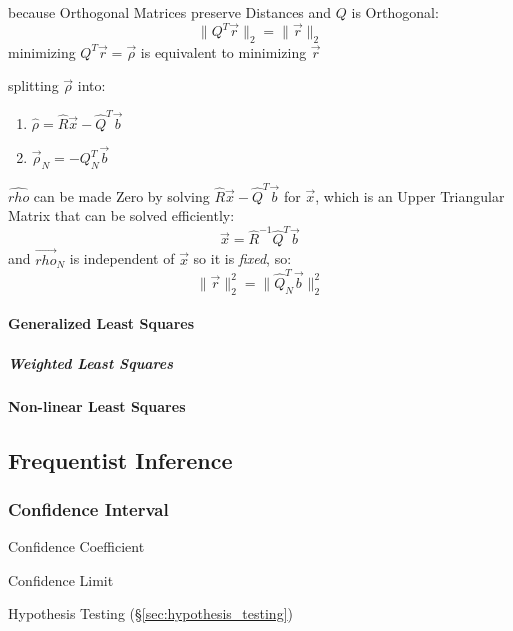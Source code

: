 because Orthogonal Matrices preserve Distances and $Q$ is Orthogonal:
\[
  \|Q^T\vec{r}\|_2 = \|\vec{r}\|_2
\]
minimizing $Q^T\vec{r} = \vec{\rho}$ is equivalent to minimizing $\vec{r}$

splitting $\vec{\rho}$ into:
\begin{enumerate}
  \item $\hat{\rho}   = \hat{R}\vec{x} - \hat{Q}^T\vec{b}$
  \item $\vec{\rho}_N = -Q_N^T\vec{b}$
\end{enumerate}
$\hat{rho}$ can be made Zero by solving $\hat{R}\vec{x} - \hat{Q}^T\vec{b}$ for
$\vec{x}$, which is an Upper Triangular Matrix that can be solved efficiently:
\[
  \vec{x} = \hat{R}^{-1}\hat{Q}^T\vec{b}
\]
and $\vec{rho}_N$ is independent of $\vec{x}$ so it is \emph{fixed}, so:
\[
  \|\vec{r}\|^2_2 = \|\hat{Q}_N^T\vec{b}\|_2^2
\]



\paragraph{Generalized Least Squares}\label{sec:generalized_least_squares}\hfill

\subparagraph{Weighted Least Squares}\label{sec:weighted_least_squares}\hfill



\paragraph{Non-linear Least Squares}\label{sec:nonlinear_least_squares}\hfill



\subsection{Frequentist Inference}\label{sec:frequentist_inference}

\subsubsection{Confidence Interval}\label{sec:confidence_interval}

Confidence Coefficient

Confidence Limit

Hypothesis Testing (\S\ref{sec:hypothesis_testing})

